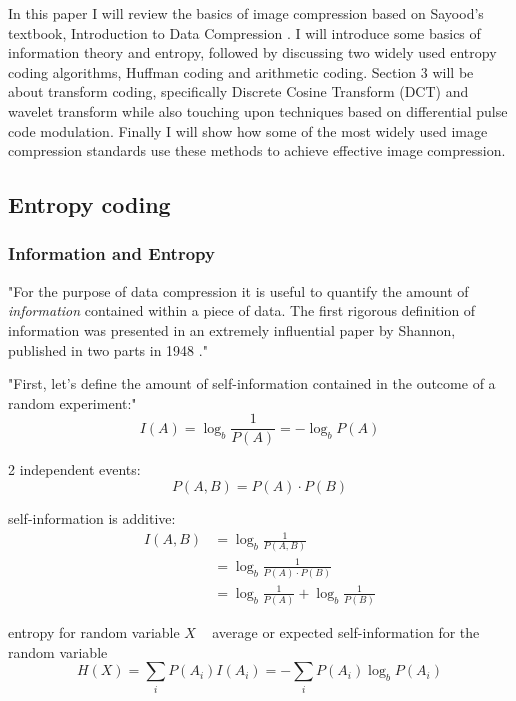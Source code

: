   In this paper I will review the basics of image compression based on Sayood's textbook, Introduction to Data Compression \cite{sayood_introduction_2012}. 
  I will introduce some basics of information theory and entropy, followed by discussing two widely used entropy coding algorithms, Huffman coding and arithmetic coding. Section 3 will be about transform coding, specifically Discrete Cosine Transform (DCT) and wavelet transform while also touching upon techniques based on differential pulse code modulation. Finally I will show how some of the most widely used image compression standards use these methods to achieve effective image compression.

  \subsection{Entropy coding}
    \subsubsection{Information and Entropy}
      "For the purpose of data compression it is useful to quantify the amount of \textit{information} contained within a piece of data. The first rigorous definition of information was presented in an extremely influential paper by Shannon, published in two parts in 1948 \cite{shannon_mathematical_1948, shannon_mathematical_1948-1}."

      "First, let's define the amount of self-information contained in the outcome of a random experiment:"
      \begin{equation}
        I(A) = \log_b \frac{1}{P(A)} = - \log_b P(A)
      \end{equation}

      2 independent events:
      \begin{equation}
        P(A,B) = P(A) \cdot P(B)
      \end{equation}

      self-information is additive:
      \begin{align}
        I(A,B) &= \log_b \frac{1}{P(A,B)} \\
        &= \log_b \frac{1}{P(A) \cdot P(B)} \\
        &= \log_b \frac{1}{P(A)} + \log_b \frac{1}{P(B)}
      \end{align}

      entropy for random variable $X$ ~ average or expected self-information for the random variable
      \begin{equation}
        H(X) = \sum_i P(A_i)I(A_i) = - \sum_i P(A_i) \log_b P(A_i)
      \end{equation}

